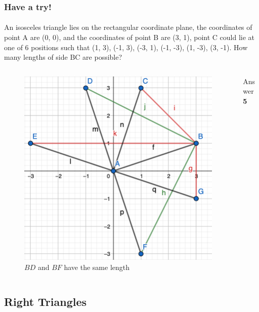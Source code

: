 \documentclass[
	11pt, %
]{beamer}
\begin{document}


\begin{frame}
	\frametitle{Have a try!}
	\framesubtitle{}
An isosceles triangle lies on the rectangular coordinate plane, the coordinates of
point A are (0, 0), and the coordinates of point B are (3, 1), point C could lie at one of
6 positions such that (1, 3), (-1, 3), (-3, 1), (-1, -3), (1, -3), (3, -1). How many lengths of
side BC are possible?\\
	\begin{columns}[t] 
		\begin{column}{0.8\textwidth} %
		\begin{figure}
			\includegraphics[width=0.5\linewidth]{Isosceles_Example_Question1.png}
			\caption{$BD$ and $BF$ have the same length}
		\end{figure}
		\end{column}
		\begin{column}{0.2\textwidth} %
		\pause
		\bigskip
		Answer \textbf{5}
		\end{column}
	\end{columns}





\end{frame}


\subsection{Right Triangles}

\end{document}
